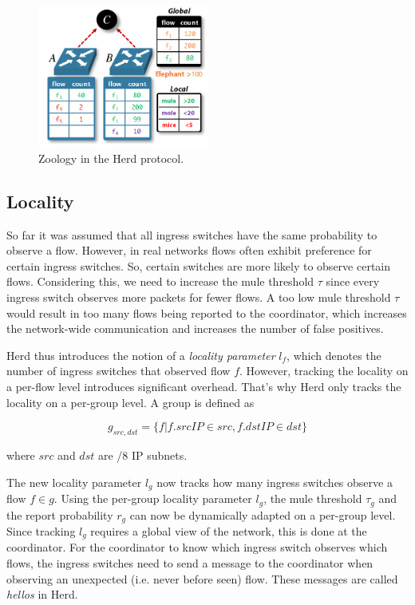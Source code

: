 \documentclass[11pt,oneside,a4paper]{article}
\begin{document}
\begin{figure}
	\centering
	\includegraphics[width=0.5\textwidth, scale=1]{figures/paper_zoo}
	\caption{Zoology in the Herd protocol.}
	\label{fig:zoo_fig}
\end{figure}

\subsection{Locality} \label{locality}
So far it was assumed that all ingress switches have the same probability to observe a flow. However, in real networks flows often exhibit preference for certain ingress switches. So, certain switches are more likely to observe certain flows. Considering this, we need to increase the mule threshold $\tau$ since every ingress switch observes more packets for fewer flows. A too low mule threshold $\tau$ would result in too many flows being reported to the coordinator, which increases the network-wide communication and increases the number of false positives.

Herd thus introduces the notion of a \textit{locality parameter} $l_f$, which denotes the number of ingress switches that observed flow $f$. However, tracking the locality on a per-flow level introduces significant overhead. That's why Herd only tracks the locality on a per-group level. A group is defined as

$$g_{src,dst} = \{f | f.srcIP \in src, f.dstIP \in dst\}$$

\noindent where $src$ and $dst$ are /8 IP subnets.

\noindent The new locality parameter $l_g$ now tracks how many ingress switches observe a flow $f \in g$. Using the per-group locality parameter $l_g$, the mule threshold $\tau_g$ and the report probability $r_g$ can now be dynamically adapted on a per-group level. Since tracking $l_g$ requires a global view of the network, this is done at the coordinator. For the coordinator to know which ingress switch observes which flows, the ingress switches need to send a message to the coordinator when observing an unexpected (i.e. never before seen) flow. These messages are called \textit{hellos} in Herd.
\end{document}
